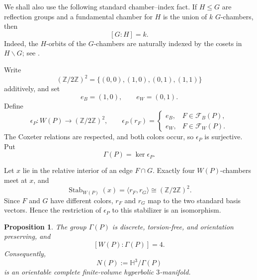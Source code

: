 \documentclass[11pt,a4paper]{amsart}
\newcommand{\HH}{\mathbb H}
\newcommand{\ZZ}{\mathbb Z}
\newcommand{\cF}{\mathcal F}
\theoremstyle{plain}
\newtheorem{proposition}[theorem]{Proposition}
\theoremstyle{remark}
\begin{document}
We shall also use the following standard chamber--index fact.  If
$H\leq G$ are reflection groups and a fundamental chamber for $H$ is
the union of $k$ $G$-chambers, then
\[
  [G:H]=k.
\]
Indeed, the $H$-orbits of the $G$-chambers are naturally indexed by
the cosets in $H\backslash G$; see
\cite[Section~5.1 and Theorem~6.4.3]{Davis}.

Write
\[
  (\ZZ/2\ZZ)^2=\{(0,0),(1,0),(0,1),(1,1)\}
\]
additively, and set
\[
  e_B=(1,0),\qquad e_W=(0,1).
\]
Define
\begin{equation}\label{eq:checkerboard-map}
  \epsilon_P:W(P)\longrightarrow(\ZZ/2\ZZ)^2,
  \qquad
  \epsilon_P(r_F)=
  \begin{cases}
    e_B,&F\in\cF_B(P),\\
    e_W,&F\in\cF_W(P).
  \end{cases}
\end{equation}
The Coxeter relations are respected, and both colors occur, so
$\epsilon_P$ is surjective.  Put
\begin{equation}\label{eq:checkerboard-kernel}
  \Gamma(P)=\ker\epsilon_P.
\end{equation}

Let $x$ lie in the relative interior of an edge $F\cap G$.  Exactly
four $W(P)$-chambers meet at $x$, and
\[
  \operatorname{Stab}_{W(P)}(x)
  =\langle r_F,r_G\rangle
  \cong(\ZZ/2\ZZ)^2.
\]
Since $F$ and $G$ have different colors, $r_F$ and $r_G$ map to the
two standard basis vectors.  Hence the restriction of $\epsilon_P$
to this stabilizer is an isomorphism.

\begin{proposition}\label{prop:kernel-manifold}
The group $\Gamma(P)$ is discrete, torsion-free, and orientation
preserving, and
\[
  [W(P):\Gamma(P)]=4.
\]
Consequently,
\begin{equation}\label{eq:NP}
  N(P):=\HH^3/\Gamma(P)
\end{equation}
is an orientable complete finite-volume hyperbolic $3$-manifold.
\end{proposition}
\end{document}
